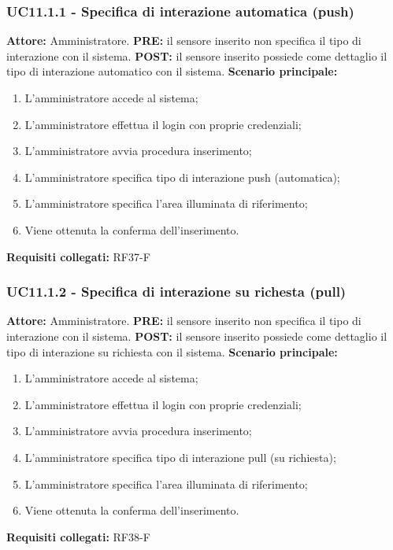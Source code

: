\documentclass[a4paper, 12pt]{article}
\begin{document}
\subsubsection{UC11.1.1 - Specifica di interazione automatica (push)}
\textbf{Attore:} Amministratore.\newline
\textbf{PRE:} il sensore inserito non specifica il tipo di interazione con il sistema.\newline
\textbf{POST:} il sensore inserito possiede come dettaglio il tipo di interazione automatico con il sistema.\newline
\textbf{Scenario principale:}
\begin{enumerate}
    \item L'amministratore accede al sistema;
    \item L'amministratore effettua il login con proprie credenziali;
    \item L'amministratore avvia procedura inserimento;
    \item L'amministratore specifica tipo di interazione push (automatica);
    \item L'amministratore specifica l'area illuminata di riferimento;
    \item Viene ottenuta la conferma dell'inserimento.
\end{enumerate}
\textbf{Requisiti collegati:} RF37-F\newline

\subsubsection{UC11.1.2 - Specifica di interazione su richesta (pull)}
\textbf{Attore:} Amministratore.\newline
\textbf{PRE:} il sensore inserito non specifica il tipo di interazione con il sistema.\newline
\textbf{POST:} il sensore inserito possiede come dettaglio il tipo di interazione su richiesta con il sistema.\newline
\textbf{Scenario principale:}
\begin{enumerate}
    \item L'amministratore accede al sistema;
    \item L'amministratore effettua il login con proprie credenziali;
    \item L'amministratore avvia procedura inserimento;
    \item L'amministratore specifica tipo di interazione pull (su richiesta);
    \item L'amministratore specifica l'area illuminata di riferimento;
    \item Viene ottenuta la conferma dell'inserimento.
\end{enumerate}
\textbf{Requisiti collegati:} RF38-F\newline
\end{document}

